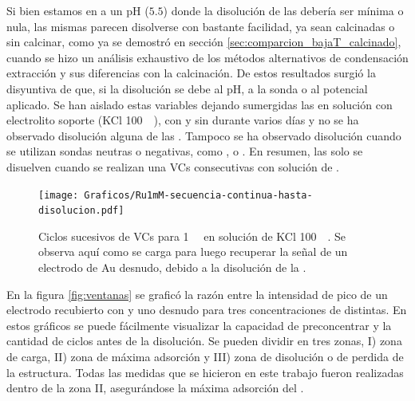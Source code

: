 		\marginpar{\color{red}{Colocar el grafico de disolucion para Ru 1mM calcinado en Au CNEA!! También el grafico de i en funcion de los ciclos}}

		Si bien estamos en a un pH ($5.5$) donde la disolución de las \pdmF\space debería ser mínima o nula, las mismas parecen disolverse con bastante \marginpar{\color{red}{Esta seccion la tengo que colorcar en l capitulo de mesoporosos, donde comparo los sistemas calcinados con los hechos a bajas T.}}facilidad, ya sean \pdmF\space calcinadas o sin calcinar, como ya se demostró en sección \ref{sec:comparcion_bajaT_calcinado}, cuando se hizo un análisis exhaustivo de los métodos alternativos de condensación extracción y sus diferencias con la calcinación. De estos resultados surgió la disyuntiva de que, si la disolución se debe al pH, a la sonda o al potencial aplicado. Se han aislado estas variables dejando sumergidas las \pdmF\space en solución con electrolito soporte (KCl \SI{100}{\milli\Molar}), con y sin \ru\space durante varios días y no se ha observado disolución alguna de las \pdm. Tampoco se ha observado disolución cuando se utilizan sondas neutras o negativas, como \fe, \hq\space o \fc. En resumen, las \pdmF\space solo se disuelven cuando se realizan una VCs consecutivas con solución de \ru\space.
			
			\begin{figure}[ht]
				\centering
		 	    \texttt{[image: Graficos/Ru1mM-secuencia-continua-hasta-disolucion.pdf]}
		        \caption[Disolución de una \pdmF\space en \ru.]{Ciclos sucesivos de VCs para \ru\space \SI{1}{\milli\Molar} en solución de KCl \SI{100}{\milli\Molar}. Se observa aquí como se carga para luego recuperar la señal de un electrodo de Au desnudo, debido a la disolución de la \pdmF.}
		        \label{fig:diso_ru1mM}
		      	\end{figure} 

		 En la figura \ref{fig:ventanas} se graficó la razón entre la intensidad de pico de un electrodo recubierto con \pdmF\space y uno desnudo para tres concentraciones de \ru\space distintas. En estos gráficos se puede fácilmente visualizar la capacidad de preconcentrar y la cantidad de ciclos antes de la disolución. Se pueden dividir en tres zonas, I) zona de carga, II) zona de máxima adsorción y III) zona de disolución o de perdida de la estructura. Todas las medidas que se hicieron en este trabajo fueron realizadas dentro de la zona II, asegurándose la máxima adsorción del \ru\space.

